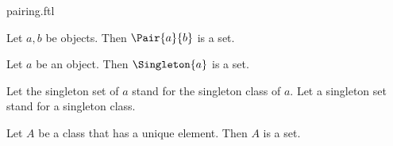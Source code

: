\documentclass{stex}
\begin{document}
\begin{smodule}{pairing.ftl}



\begin{axiom*}[forthel,title=Pairing,name=Pairing Axiom]
  Let $a, b$ be objects.
  Then $\Pair{a}{b}$ is a set.
\end{axiom*}

\begin{proposition*}[forthel]
  Let $a$ be an object.
  Then $\Singleton{a}$ is a set.
\end{proposition*}

\begin{convention*}[forthel,for=singleton set]
  Let the singleton set of $a$ stand for the singleton class of $a$.
  Let a singleton set stand for a singleton class.
\end{convention*}

\begin{proposition*}[forthel]
  Let $A$ be a class that has a unique element.
  Then $A$ is a set.
\end{proposition*}

\end{smodule}
\end{document}
